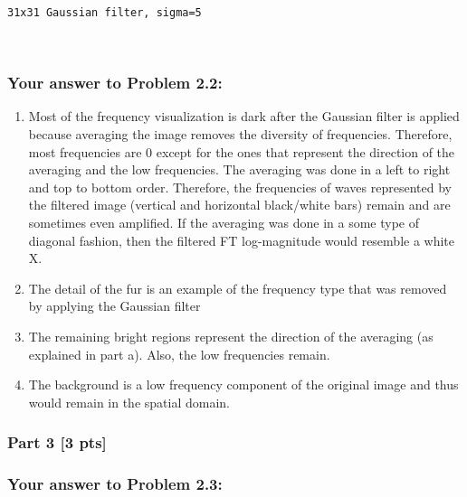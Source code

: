 \documentclass[11pt]{article}
\begin{document}
    \begin{Verbatim}[commandchars=\\\{\}]
31x31 Gaussian filter, sigma=5
    \end{Verbatim}

    \begin{center}
    \end{center}
    { \hspace*{\fill} \\}
    
    \hypertarget{your-answer-to-problem-2.2}{%
\subsubsection{Your answer to Problem
2.2:}\label{your-answer-to-problem-2.2}}

\begin{enumerate}
\def\labelenumi{\alph{enumi})}
\item
  Most of the frequency visualization is dark after the Gaussian filter
  is applied because averaging the image removes the diversity of
  frequencies. Therefore, most frequencies are 0 except for the ones
  that represent the direction of the averaging and the low frequencies.
  The averaging was done in a left to right and top to bottom order.
  Therefore, the frequencies of waves represented by the filtered image
  (vertical and horizontal black/white bars) remain and are sometimes
  even amplified. If the averaging was done in a some type of diagonal
  fashion, then the filtered FT log-magnitude would resemble a white X.
\item
  The detail of the fur is an example of the frequency type that was
  removed by applying the Gaussian filter
\item
  The remaining bright regions represent the direction of the averaging
  (as explained in part a). Also, the low frequencies remain.
\item
  The background is a low frequency component of the original image and
  thus would remain in the spatial domain.
\end{enumerate}

    \hypertarget{part-3-3-pts}{%
\subsubsection{Part 3 {[}3 pts{]}}\label{part-3-3-pts}}

    \hypertarget{your-answer-to-problem-2.3}{%
\subsubsection{Your answer to Problem
2.3:}\label{your-answer-to-problem-2.3}}
\end{document}
